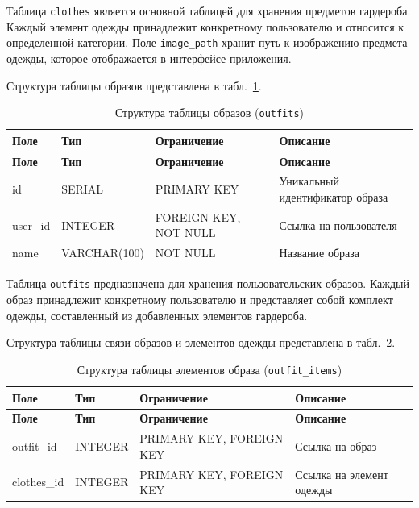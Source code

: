 Таблица \texttt{clothes} является основной таблицей для хранения предметов гардероба. Каждый элемент одежды принадлежит конкретному пользователю и относится к определенной категории. Поле \texttt{image\_path} хранит путь к изображению предмета одежды, которое отображается в интерфейсе приложения.

Структура таблицы образов представлена в табл.~\ref{tab:db_outfits}.

\begin{longtable}{|l|l|p{3.5cm}|p{5.5cm}|}
	\caption{Структура таблицы образов (\texttt{outfits})}
	\label{tab:db_outfits} \\

	\hline
	\textbf{Поле} & \textbf{Тип} & \textbf{Ограничение} & \textbf{Описание} \\ \hline
	\endfirsthead

	\tabcont{\ref{tab:db_outfits}}
	\textbf{Поле} & \textbf{Тип} & \textbf{Ограничение} & \textbf{Описание} \\ \hline
	\endhead

	\hline
	\endfoot

	\hline
	\endlastfoot

	id & SERIAL & PRIMARY KEY & Уникальный идентификатор образа \\ \hline
	user\_id & INTEGER & FOREIGN KEY, NOT NULL & Ссылка на пользователя \\ \hline
	name & VARCHAR(100) & NOT NULL & Название образа \\ \hline
\end{longtable}

Таблица \texttt{outfits} предназначена для хранения пользовательских образов. Каждый образ принадлежит конкретному пользователю и представляет собой комплект одежды, составленный из добавленных элементов гардероба.

Структура таблицы связи образов и элементов одежды представлена в табл.~\ref{tab:db_outfit_items}.

\begin{longtable}{|l|l|p{3.5cm}|p{5.5cm}|}
	\caption{Структура таблицы элементов образа (\texttt{outfit\_items})}
	\label{tab:db_outfit_items} \\

	\hline
	\textbf{Поле} & \textbf{Тип} & \textbf{Ограничение} & \textbf{Описание} \\ \hline
	\endfirsthead

	\tabcont{\ref{tab:db_outfit_items}}
	\textbf{Поле} & \textbf{Тип} & \textbf{Ограничение} & \textbf{Описание} \\ \hline
	\endhead

	\hline
	\endfoot

	\hline
	\endlastfoot

	outfit\_id & INTEGER & PRIMARY KEY, FOREIGN KEY & Ссылка на образ \\ \hline
	clothes\_id & INTEGER & PRIMARY KEY, FOREIGN KEY & Ссылка на элемент одежды \\ \hline
\end{longtable}


